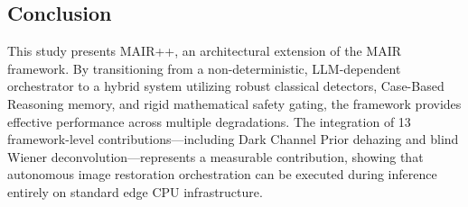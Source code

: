 \documentclass[journal, 10pt]{IEEEtran}
\begin{document}
\subsection{Conclusion}
This study presents MAIR++, an architectural extension of the MAIR framework. By transitioning from a non-deterministic, LLM-dependent orchestrator to a hybrid system utilizing robust classical detectors, Case-Based Reasoning memory, and rigid mathematical safety gating, the framework provides effective performance across multiple degradations. The integration of 13 framework-level contributions—including Dark Channel Prior dehazing and blind Wiener deconvolution—represents a measurable contribution, showing that autonomous image restoration orchestration can be executed during inference entirely on standard edge CPU infrastructure.
\end{document}
